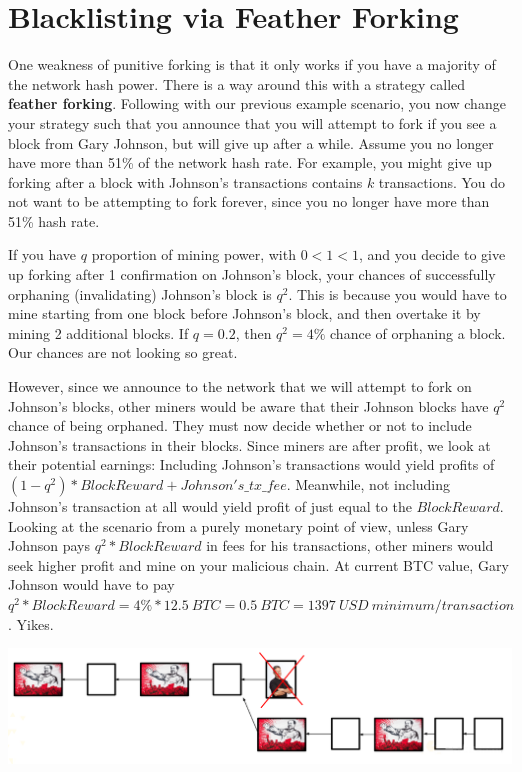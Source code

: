 \documentclass[full.tex]{subfiles}
\begin{document}
    \section*{Blacklisting via Feather Forking}
    
    One weakness of punitive forking is that it only works if you have a majority of the network hash power. There is a way around this with a strategy called \textbf{feather forking}. Following with our previous example scenario, you now change your strategy such that you announce that you will attempt to fork if you see a block from Gary Johnson, but will give up after a while. Assume you no longer have more than 51\% of the network hash rate. For example, you might give up forking after a block with Johnson's transactions contains $k$ transactions. You do not want to be attempting to fork forever, since you no longer have more than 51\% hash rate.
    
    If you have $q$ proportion of mining power, with $0 < 1 < 1$, and you decide to give up forking after 1 confirmation on Johnson's block, your chances of successfully orphaning (invalidating) Johnson's block is $q^2$. This is because you would have to mine starting from one block before Johnson's block, and then overtake it by mining 2 additional blocks. If $q= 0.2$, then $q^2 = 4\%$ chance of orphaning a block. Our chances are not looking so great.
    
    However, since we announce to the network that we will attempt to fork on Johnson's blocks, other miners would be aware that their Johnson blocks have $q^2$ chance of being orphaned. They must now decide whether or not to include Johnson's transactions in their blocks. Since miners are after profit, we look at their potential earnings: Including Johnson's transactions would yield profits of $(1-q^2)*BlockReward + Johnson's\_tx\_fee$. Meanwhile, not including Johnson's transaction at all would yield profit of just equal to the $BlockReward$. Looking at the scenario from a purely monetary point of view, unless Gary Johnson pays $q^2*BlockReward$ in fees for his transactions, other miners would seek higher profit and mine on your malicious chain. At current BTC value, Gary Johnson would have to pay $q^2*BlockReward = 4\%*12.5~BTC = 0.5~BTC = 1397~USD~minimum / transaction$. Yikes.
    
    \begin{center}
        \includegraphics[scale=0.4]{blacklist_feather}
    \end{center}
    
\end{document}
